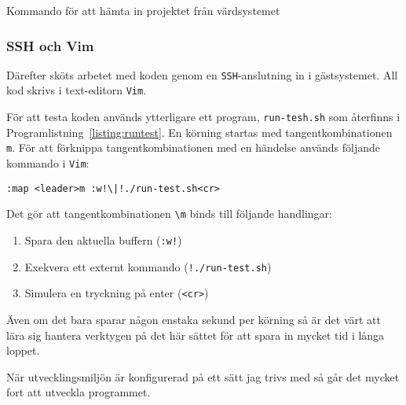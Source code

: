 \begin{listing}[H]
\caption{Kommando för att hämta in projektet från värdsystemet}
\label{listing:gitclone}
\end{listing}


\subsubsection{SSH och Vim}
Därefter sköts arbetet med koden genom en \texttt{SSH}-anslutning in i
gästsystemet.  All kod skrivs i text-editorn \texttt{Vim}. 

För att testa koden används ytterligare ett program, \texttt{run-tesh.sh} som
återfinns i Programlistning~\ref{listing:runtest}.  En körning startas med
tangentkombinationen \texttt{\\ m}.  För att förknippa tangentkombinationen med
en händelse används följande kommando i \texttt{Vim}:

\begin{verbatim}
:map <leader>m :w!\|!./run-test.sh<cr>
\end{verbatim}

Det gör att tangentkombinationen \texttt{\textbackslash m} binds till följande handlingar:
\begin{enumerate} 
  \item Spara den aktuella buffern (\texttt{:w!}) 
  \item Exekvera ett externt kommando (\texttt{!./run-test.sh})
  \item Simulera en tryckning på enter (\texttt{<cr>})
\end{enumerate} 

Även om det bara sparar någon enstaka sekund per körning så är det värt att
lära sig hantera verktygen på det här sättet för att spara in mycket tid i
långa loppet.

När utvecklingsmiljön är konfigurerad på ett sätt jag trivs med så går det
mycket fort att utveckla programmet.
